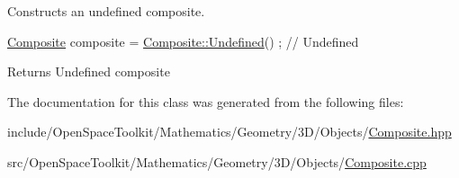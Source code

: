 Constructs an undefined composite. 


\begin{DoxyCode}
\hyperlink{classostk_1_1math_1_1geom_1_1d3_1_1objects_1_1_composite_aaecda2f184484d63a52de87706a37d4c}{Composite} composite = \hyperlink{classostk_1_1math_1_1geom_1_1d3_1_1objects_1_1_composite_abd7585518f349e7d599a81102f9e0e41}{Composite::Undefined}() ; \textcolor{comment}{// Undefined}
\end{DoxyCode}


\begin{DoxyReturn}{Returns}
Undefined composite 
\end{DoxyReturn}


The documentation for this class was generated from the following files\+:\begin{DoxyCompactItemize}
\item 
include/\+Open\+Space\+Toolkit/\+Mathematics/\+Geometry/3\+D/\+Objects/\hyperlink{3_d_2_objects_2_composite_8hpp}{Composite.\+hpp}\item 
src/\+Open\+Space\+Toolkit/\+Mathematics/\+Geometry/3\+D/\+Objects/\hyperlink{3_d_2_objects_2_composite_8cpp}{Composite.\+cpp}\end{DoxyCompactItemize}
